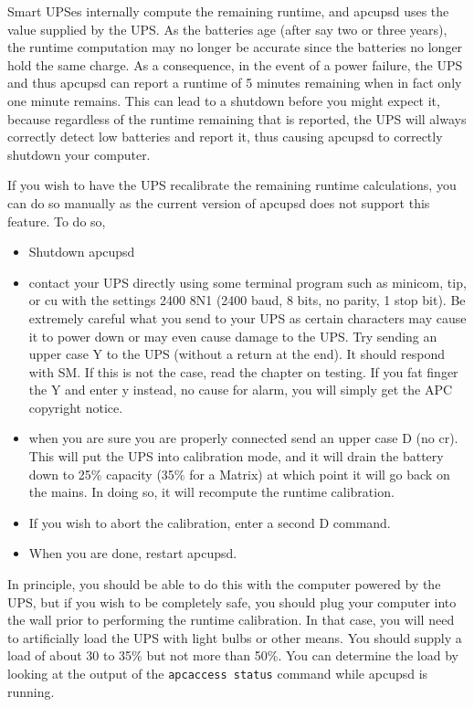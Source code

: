 {{{{{{{{{{Smart UPSes internally compute the remaining runtime, and apcupsd uses the
value supplied by the UPS. As the batteries age (after say two or three
years), the runtime computation may no longer be accurate since the batteries
no longer hold the same charge. As a consequence, in the event of a power
failure, the UPS and thus apcupsd can report a runtime of 5 minutes remaining
when in fact only one minute remains. This can lead to a shutdown before you
might expect it, because regardless of the runtime remaining that is reported,
the UPS will always correctly detect low batteries and report it, thus causing
apcupsd to correctly shutdown your computer.  

If you wish to have the UPS recalibrate the remaining runtime calculations,
you can do so manually as the current version of apcupsd does not support this
feature. To do so,  

\begin{itemize}
\item Shutdown apcupsd  
\item contact your UPS directly using some terminal program such as minicom,
tip, or cu with the settings 2400 8N1 (2400 baud, 8 bits, no parity, 1 stop
bit). Be extremely careful what you send to your UPS as certain characters may
cause it to power down or may even cause damage to the UPS. Try sending an
upper case Y to the UPS (without a return at the end). It should respond with
SM. If this is not the case, read the chapter on testing. If you fat finger
the Y and enter y instead, no cause for alarm, you will simply get the APC
copyright notice.  
\item when you are sure you are properly connected send an upper case D (no
cr). This will put the UPS into calibration mode, and it will drain the
battery down to 25\% capacity (35\% for a Matrix) at which point it will go
back on the mains. In doing so, it will recompute the runtime calibration.  
\item If you wish to abort the calibration, enter a second D command.  
\item When you are done, restart apcupsd. 
\end{itemize}

In principle, you should be able to do this with the computer powered by the
UPS, but if you wish to be completely safe, you should plug your computer into
the wall prior to performing the runtime calibration. In that case, you will
need to artificially load the UPS with light bulbs or other means. You should
supply a load of about 30 to 35\% but not more than 50\%. You can determine
the load by looking at the output of the {\tt apcaccess status} command while
apcupsd is running.  

}}}}}}}}}}
